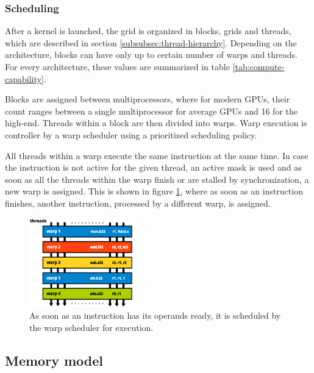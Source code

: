 \subsubsection{Scheduling}\label{subsubsec:scheduling}

After a kernel is launched, the grid is organized in blocks, grids and threads, which are described in section \ref{subsubsec:thread-hierarchy}. Depending on the architecture, blocks can have only up to certain number of warps and threads. For every architecture, these values are summarized in table \ref{tab:compute-capability}.

Blocks are assigned between multiprocessors, where for modern GPUs, their count ranges between a single multiprocessor for average GPUs and 16 for the high-end. Threads within a block are then divided into warps. Warp execution is controller by a warp scheduler using a prioritized scheduling policy.

All threads within a warp execute the same instruction at the same time. In case the instruction is not active for the given thread, an active mask is used and as soon as all the threads within the warp finish or are stalled by synchronization, a new warp is assigned. This is shown in figure \ref{fig:scheduling}, where as soon as an instruction finishes, another instruction, processed by a different warp, is assigned.

\begin{figure}[ht]
	\begin{center}
	\includegraphics[width=0.4\textwidth]{fig/scheduling.eps}
	\caption{As soon as an instruction has its operands ready, it is scheduled by the warp scheduler for execution.}
	\label{fig:scheduling}
	\end{center}
\end{figure}

\subsection{Memory model}\label{subsec:memory}

